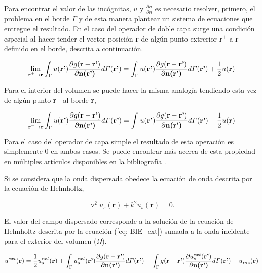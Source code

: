 \documentclass[12pt,letterpaper]{article}
\numberwithin{equation}{section}
\begin{document}
Para encontrar el valor de las incógnitas, $u$ y $\frac{\partial u}{\partial n}$ es necesario resolver, primero, el problema en el borde $\varGamma$ y de esta manera plantear un sistema de ecuaciones que entregue el resultado. En el caso del operador de doble capa surge una condición especial al hacer tender el vector posición \textbf{r} de algún punto extrerior \textbf{r$^+$} a \textbf{r} definido en el borde, descrita a continuación. 

$$\lim\limits_{\textbf{r$^+$}\rightarrow \textbf{r}}\int_{\Gamma}u(\textbf{r'})\frac{\partial g(\textbf{r}-\textbf{r'})}{\partial\textbf{n(\textbf{r'})}}d\varGamma(\textbf{r'})=\int_{\Gamma}u(\textbf{r'})\frac{\partial g(\textbf{r}-\textbf{r'})}{\partial\textbf{n(\textbf{r'})}}d\varGamma(\textbf{r'}) + \frac{1}{2}u(\textbf{r})$$

Para el interior del volumen se puede hacer la misma analogía tendiendo esta vez de algún punto \textbf{r$^-$} al borde \textbf{r},

$$\lim\limits_{\textbf{r$^-$}\rightarrow \textbf{r}}\int_{\Gamma}u(\textbf{r'})\frac{\partial g(\textbf{r}-\textbf{r'})}{\partial\textbf{n(\textbf{r'})}}d\varGamma(\textbf{r'})=\int_{\Gamma}u(\textbf{r'})\frac{\partial g(\textbf{r}-\textbf{r'})}{\partial\textbf{n(\textbf{r'})}}d\varGamma(\textbf{r'}) - \frac{1}{2}u(\textbf{r})$$

Para el caso del operador de capa simple el resultado de esta operación es simplemente $0$ en ambos casos. Se puede encontrar más acerca de esta propiedad en múltiples artículos disponibles en la bibliografía \cite{BIE_Helmholtz_1,BIE_Helmholtz_2,Multiple scattering,Multitrace_acoustic}.

Si se considera que la onda dispersada obedece la ecuación de onda descrita por la ecuación de Helmholtz,

$$\triangledown^2u_s(\textbf{r})+k^2u_s(\textbf{r})=0.$$

El valor del campo dispersado corresponde a la solución de la ecuación de Helmholtz descrita por la ecuación (\ref{eq: BIE_ext}) sumada a la onda incidente para el exterior del volumen ($\overline{\Omega}$). 

\begin{equation}
u^{ext}(\textbf{r}) = \frac{1}{2}u_s^{ext}(\textbf{r}) + \int_{\Gamma}u_s^{ext}(\textbf{r'})\frac{\partial g(\textbf{r}-\textbf{r'})}{\partial\textbf{n(\textbf{r'})}}d\varGamma(\textbf{r'}) - \int_{\Gamma}g(\textbf{r}-\textbf{r'})\frac{\partial u_s^{ext}(\textbf{r'})}{\partial\textbf{n(\textbf{r'})}}d\varGamma(\textbf{r'}) +  u_{inc}(\textbf{r})
\label{eq: BIE_borde}	
\end{equation}
\end{document}
